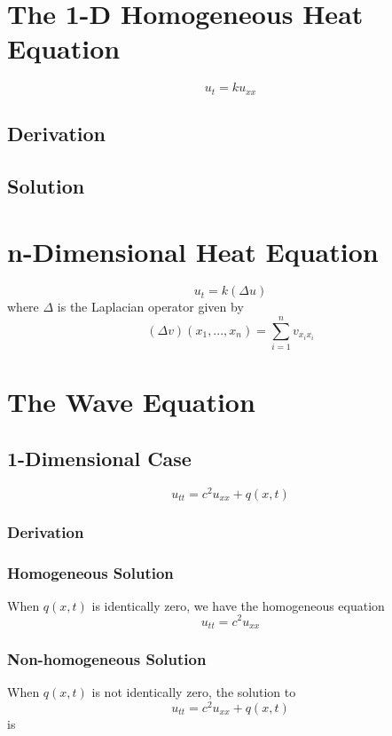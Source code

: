 \documentclass[12pt]{article}
\begin{document}
\section{The 1-D Homogeneous Heat Equation}

$$u_{t} = ku_{xx}$$

\subsection{Derivation}

\subsection{Solution}

\section{n-Dimensional Heat Equation}

$$u_t = k(\Delta u)$$ where $\Delta$ is the Laplacian operator given by $$(\Delta v)(x_1, ..., x_n) = \sum_{i = 1}^n v_{x_ix_i}$$

\section{The Wave Equation}

\subsection{1-Dimensional Case}

$$u_{tt} = c^2u_{xx} + q(x,t)$$

\subsubsection{Derivation}

\subsubsection{Homogeneous Solution}

When $q(x,t)$ is identically zero, we have the homogeneous equation $$u_{tt} = c^2u_{xx}$$

\subsubsection{Non-homogeneous Solution}

When $q(x,t)$ is not identically zero, the solution to
$$u_{tt} = c^2u_{xx} + q(x,t)$$ is
\end{document}
